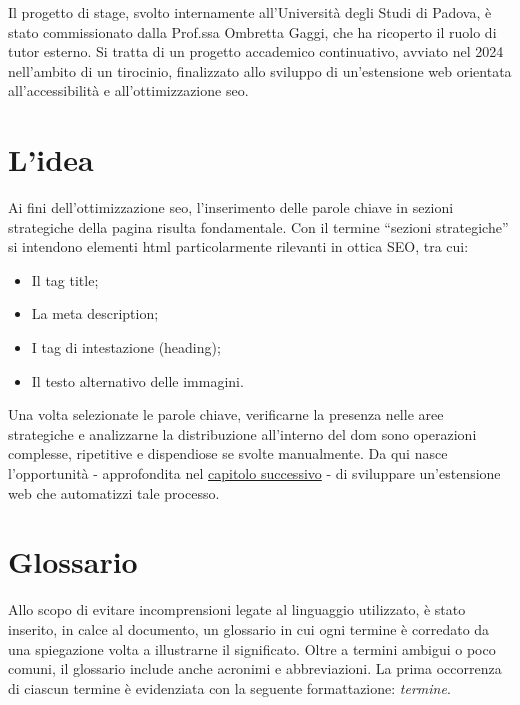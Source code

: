 \par Il progetto di stage, svolto internamente all’Università degli Studi di Padova, è stato commissionato dalla Prof.ssa Ombretta Gaggi, che ha ricoperto il ruolo di tutor esterno. Si tratta di un progetto accademico continuativo, avviato nel 2024 nell’ambito di un tirocinio, finalizzato allo sviluppo di un’estensione web orientata all’accessibilità e all’ottimizzazione \gls{seo}.

\section{L'idea}

\par Ai fini dell’ottimizzazione \gls{seo}, l’inserimento delle parole chiave in sezioni strategiche della pagina risulta fondamentale. Con il termine “sezioni strategiche” si intendono elementi \gls{html} particolarmente rilevanti in ottica SEO, tra cui:
\begin{itemize}
    \item Il tag title;
    \item La meta description;
    \item I tag di intestazione (heading);
    \item Il testo alternativo delle immagini.
\end{itemize}

\vspace{5pt}
\par\noindent Una volta selezionate le parole chiave, verificarne la presenza nelle aree strategiche e analizzarne la distribuzione all’interno del \gls{dom} sono operazioni complesse, ripetitive e dispendiose se svolte manualmente. Da qui nasce l’opportunità - approfondita nel \hyperref[cap:descrizione-progetto]{capitolo successivo} - di sviluppare un’estensione web che automatizzi tale processo.

\section{Glossario}

\par Allo scopo di evitare incomprensioni legate al linguaggio utilizzato, è stato inserito, in calce al documento, un glossario in cui ogni termine è corredato da una spiegazione volta a illustrarne il significato. Oltre a termini ambigui o poco comuni, il glossario include anche acronimi e abbreviazioni. La prima occorrenza di ciascun termine è evidenziata con la seguente formattazione: \emph{termine}\glsfirstoccur.

